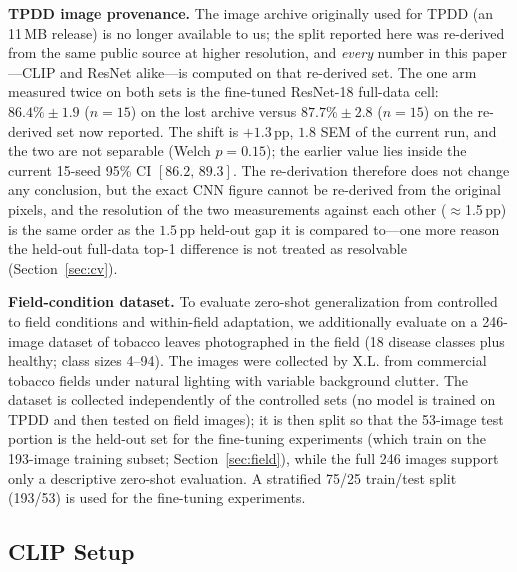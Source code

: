 \documentclass[10pt,a4paper]{article}
\begin{document}
\textbf{TPDD image provenance.} The image archive originally used for TPDD (an 11\,MB release) is no longer available to us; the split reported here was re-derived from the same public source at higher resolution, and \emph{every} number in this paper---CLIP and ResNet alike---is computed on that re-derived set. The one arm measured twice on both sets is the fine-tuned ResNet-18 full-data cell: $86.4\%\pm1.9$ ($n{=}15$) on the lost archive versus $87.7\%\pm2.8$ ($n{=}15$) on the re-derived set now reported. The shift is $+1.3$\,pp, $1.8$ SEM of the current run, and the two are not separable (Welch $p{=}0.15$); the earlier value lies inside the current 15-seed 95\% CI $[86.2,\,89.3]$. The re-derivation therefore does not change any conclusion, but the exact CNN figure cannot be re-derived from the original pixels, and the resolution of the two measurements against each other ($\approx$1.5\,pp) is the same order as the $1.5$\,pp held-out gap it is compared to---one more reason the held-out full-data top-1 difference is not treated as resolvable (Section~\ref{sec:cv}).

\textbf{Field-condition dataset.} To evaluate zero-shot generalization from controlled to field conditions and within-field adaptation, we additionally evaluate on a 246-image dataset of tobacco leaves photographed in the field (18 disease classes plus healthy; class sizes 4--94). The images were collected by X.L. from commercial tobacco fields under natural lighting with variable background clutter. The dataset is collected independently of the controlled sets (no model is trained on TPDD and then tested on field images); it is then split so that the 53-image test portion is the held-out set for the fine-tuning experiments (which train on the 193-image training subset; Section~\ref{sec:field}), while the full 246 images support only a descriptive zero-shot evaluation. A stratified 75/25 train/test split (193/53) is used for the fine-tuning experiments.

\subsection{CLIP Setup}
\end{document}
